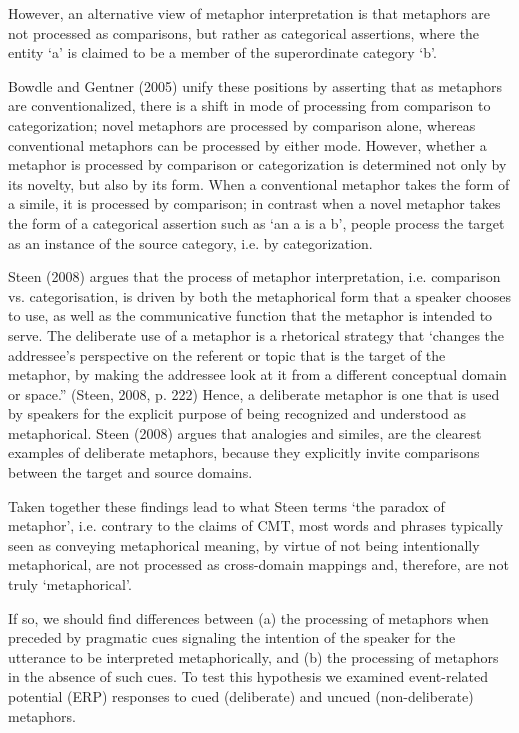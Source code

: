 \documentclass[]{article}
\begin{document}
	However, an alternative view of metaphor interpretation is that metaphors are not processed as comparisons, but rather as categorical assertions, where the entity ‘a’ is claimed to be a member of the superordinate category ‘b’.  
	
	Bowdle and Gentner (2005) unify these positions by asserting that as metaphors are conventionalized, there is a shift in mode of processing from comparison to categorization; novel metaphors are processed by comparison alone, whereas conventional metaphors can be processed by either mode.  However, whether a metaphor is processed by comparison or categorization is determined not only by its novelty, but also by its form.  When a conventional metaphor takes the form of a simile, it is processed by comparison; in contrast when a novel metaphor takes the form of a categorical assertion such as ‘an a is a b’, people process the target as an instance of the source category, i.e. by categorization.
	
	Steen (2008) argues that the process of metaphor interpretation, i.e. comparison vs. categorisation, is driven by both the metaphorical form that a speaker chooses to use, as well as the communicative function that the metaphor is intended to serve.
	The deliberate use of a metaphor is a rhetorical strategy that ‘changes the addressee’s perspective on the referent or topic that is the target of the metaphor, by making the addressee look at it from a different conceptual domain or space.” (Steen, 2008, p. 222)
	Hence, a deliberate metaphor is one that is used by speakers for the explicit purpose of being recognized and understood as metaphorical.
	Steen (2008) argues that analogies and similes, are the clearest examples of deliberate metaphors, because they explicitly invite comparisons between the target and source domains. 
	
	Taken together these findings lead to what Steen terms ‘the paradox of metaphor’, i.e. contrary to the claims of CMT, most words and phrases typically seen as conveying metaphorical meaning, by virtue of not being intentionally metaphorical, are not processed as cross-domain mappings and, therefore, are not truly ‘metaphorical’. 
	
	If so, we should find differences between (a) the processing of metaphors when preceded by pragmatic cues signaling the intention of the speaker for the utterance to be interpreted metaphorically, and (b) the processing of metaphors in the absence of such cues. 
	To test this hypothesis we examined event-related potential (ERP) responses to cued (deliberate) and uncued (non-deliberate) metaphors.
	
\end{document}
